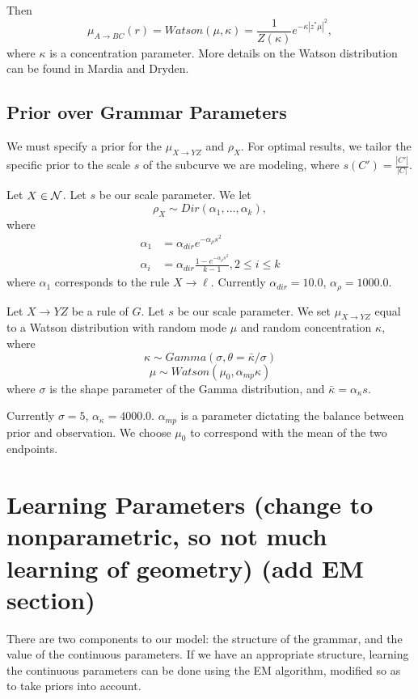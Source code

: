 \documentclass{article}
\begin{document}
Then
$$\mu_{A\to BC}(r) = Watson(\mu,\kappa) =
\frac{1}{Z(\kappa)}e^{-\kappa |z^*\mu|^2},$$ where $\kappa$ is a
concentration parameter. More details on the Watson distribution can
be found in Mardia and Dryden.

\subsection{Prior over Grammar Parameters}
\label{sec-prior-param}


We must specify a prior for the $\mu_{X\to YZ}$ and $\rho_X$.  For
optimal results, we tailor the specific prior to the scale $s$ of the
subcurve we are modeling, where $s(C') = \frac{|C'|}{|C|}$.

Let $X\in {\mathcal N}$. Let $s$ be our scale parameter. We let
$$\rho_X \sim Dir(\alpha_1, \dots, \alpha_k),$$
where
\begin{align*}
\alpha_1 &= \alpha_{dir} e^{- \alpha_{\rho} s^2} \\
\alpha_i &= \alpha_{dir} \frac{1 - e^{- \alpha_{\rho}s^2}}{k-1}, 2\le i\le k
\end{align*}
where $\alpha_1$ corresponds to the rule $X\to \ell$.
Currently $\alpha_{dir} = 10.0$, $\alpha_\rho = 1000.0$.

Let $X\to YZ$ be a rule of $G$. Let $s$ be our scale parameter.  We
set $\mu_{X\to YZ}$ equal to a Watson distribution with random mode $\mu$ and
random concentration $\kappa$, where
$$\kappa \sim Gamma(\sigma, \theta=\bar{\kappa}/\sigma)$$
$$\mu \sim Watson(\mu_0, \alpha_{mp} \kappa)$$
where $\sigma$ is the shape parameter of the Gamma distribution, and
$\bar{\kappa} = \alpha_{\kappa} s$. 

Currently $\sigma=5$, $\alpha_\kappa = 4000.0$. $\alpha_{mp}$ is a
parameter dictating the balance between prior and observation.  We
choose $\mu_0$ to correspond with the mean of the two endpoints.


\section{Learning Parameters (change to nonparametric, so not much learning of geometry) (add EM section)}

There are two components to our model: the structure of the grammar,
and the value of the continuous parameters. If we have an appropriate
structure, learning the continuous parameters can be done using the EM
algorithm, modified so as to take priors into account.
\end{document}
